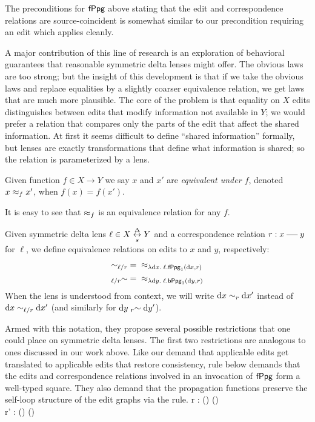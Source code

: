 The preconditions for $\mathsf{fPpg}$ above stating that the edit and
correspondence relations are source-coincident is somewhat similar to our
precondition requiring an edit which applies cleanly.

A major contribution of this line of research is an exploration of
behavioral guarantees that reasonable symmetric delta lenses might offer.
The obvious laws are too strong; but the insight of this development is that
if we take the obvious laws and replace equalities by a slightly coarser
equivalence relation, we get laws that are much more plausible. The core of
the problem is that equality on $X$ edits distinguishes between edits that
modify information not available in $Y$; we would prefer a relation that
compares only the parts of the edit that affect the shared information.
At first it seems difficult to define ``shared information'' formally, but
lenses are exactly transformations that define what information is shared;
so the relation is parameterized by a lens.

\begin{definition}
    Given function $f \in X \to Y$ we say $x$ and $x'$ are \emph{equivalent
    under $f$}, denoted $x \approx_f x'$, when $f(x)=f(x')$.
\end{definition}

It is easy to see that $\approx_f$ is an equivalence relation for any $f$.

\begin{definition}
    Given symmetric delta lens $\ell \in X \underset{s}{\overset{\Delta}{\leftrightarrow}} Y$ and a correspondence
    relation $r : x \uedge y$ for $\ell$, we define equivalence relations on
    edits to $x$ and $y$, respectively:
    \begin{align*}
        \eqsharedl*\ell r &={} \under_{\lambda \dx.\;\ell.\mlfppg_1(\dx,r)} \\
        \eqsharedr*\ell r &={} \under_{\lambda \dy.\;\ell.\mlbppg_1(\dy,r)}
    \end{align*}
    When the lens is understood from context, we will write $\dx\eqsharedl
    r\dx'$ instead of $\dx\eqsharedl*\ell r\dx'$ (and similarly for
    $\dy\eqsharedr r\dy'$).
\end{definition}

Armed with this notation, they propose several possible restrictions that
one could place on symmetric delta lenses. The first two restrictions are
analogous to ones discussed in our work above. Like our demand that
applicable edits get translated to applicable edits that restore
consistency, rule  below demands that the edits and
correspondence relations involved in an invocation of $\mathsf{fPpg}$ form a
well-typed square. They also demand that the propagation functions preserve
the self-loop structure of the edit graphs via the  rule.
    {r  : \mldom(\dx) \uedge \mldom(\dy) \\
     r' : \mlcod(\dx) \uedge \mlcod(\dy)}

